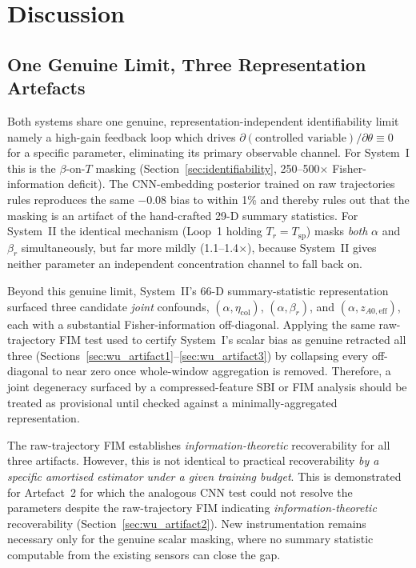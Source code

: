 \documentclass[aps,pre,twocolumn,superscriptaddress]{revtex4-2}
\begin{document}
\section{Discussion}
\label{sec:discussion}

\subsection{One Genuine Limit, Three Representation Artefacts}
\label{sec:disc_limit_artefacts}

Both systems share one genuine, representation-independent identifiability
limit namely a high-gain feedback loop which drives
$\partial(\text{controlled variable})/\partial\theta \equiv 0$ for a specific
parameter, eliminating its primary observable channel. For System~I this is
the $\beta$-on-$T$ masking (Section~\ref{sec:identifiability}, 250--500$\times$
Fisher-information deficit). The CNN-embedding posterior trained on raw
trajectories rules reproduces the same $-0.08$ bias to within 1\% and thereby rules out that the masking is an artifact of the 
hand-crafted 29-D summary statistics. 
For System~II the identical mechanism (Loop~1 holding $T_r = T_\mathrm{sp}$)
masks \emph{both} $\alpha$ and $\beta_r$ simultaneously, but far more mildly
(1.1--1.4$\times$), because System~II gives neither parameter an independent
concentration channel to fall back on.

Beyond this genuine limit, System~II's 66-D summary-statistic representation
surfaced three candidate \emph{joint} confounds, 
$(\alpha,\eta_\mathrm{col})$, $(\alpha,\beta_r)$, and
$(\alpha,z_{A0,\mathrm{eff}})$, each with a substantial Fisher-information
off-diagonal. Applying the same raw-trajectory FIM test used to certify
System~I's scalar bias as genuine retracted all three
(Sections~\ref{sec:wu_artifact1}--\ref{sec:wu_artifact3}) by collapsing every off-diagonal
to near zero once whole-window aggregation is removed. 
Therefore, a joint degeneracy surfaced by a
compressed-feature SBI or FIM analysis should be treated as provisional
until checked against a minimally-aggregated representation. 

The raw-trajectory FIM establishes \emph{information-theoretic} recoverability for all three artifacts. However, this is not identical to practical recoverability \emph{by a specific amortised estimator under a given training budget}. This is demonstrated for Artefact~2 for which the analogous CNN test could not resolve the parameters despite the raw-trajectory FIM indicating \emph{information-theoretic} recoverability (Section~\ref{sec:wu_artifact2}). 
New instrumentation remains necessary only for the genuine scalar masking, where
no summary statistic computable from the existing sensors can close the gap.
\end{document}
